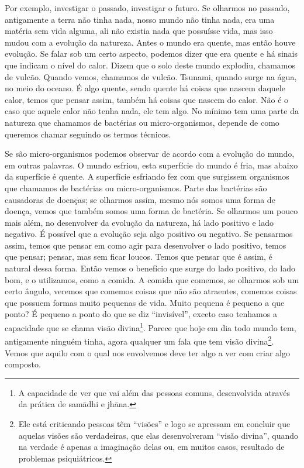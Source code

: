 Por exemplo, investigar o passado, investigar o futuro. Se olharmos
no passado, antigamente a terra não tinha nada, nosso mundo não tinha
nada, era uma matéria sem vida alguma, ali não existia nada que
possuísse vida, mas isso mudou com a evolução da natureza. Antes o
mundo era quente, mas então houve evolução. Se falar sob um certo
aspecto, podemos dizer que era quente e há sinais que indicam o nível
do calor. Dizem que o solo deste mundo explodiu, chamamos de vulcão.
Quando vemos, chamamos de vulcão. Tsunami, quando surge na água, no
meio do oceano. É algo quente, sendo quente há coisas que nascem
daquele calor, temos que pensar assim, também há coisas que nascem do
calor. Não é o caso que aquele calor não tenha nada, ele tem algo. No
mínimo tem uma parte da natureza que chamamos de bactérias ou
micro-organismos, depende de como queremos chamar
seguindo os termos técnicos. 

Se são micro-organismos podemos observar de acordo com a evolução do
mundo, em outras palavras. O mundo esfriou, esta superfície do mundo é
fria, mas abaixo da superfície é quente. A superfície esfriando fez com
que surgissem organismos que chamamos de bactérias ou micro-organismos.
Parte das bactérias são causadoras de doenças; se olharmos assim, mesmo
nós somos uma forma de doença, vemos que também somos uma forma de
bactéria. Se olharmos um pouco mais além, no desenvolver da evolução da
natureza, há lado positivo e lado negativo. É possível que a evolução
seja algo positivo ou negativo. Se pensarmos
assim, temos que pensar em como agir para desenvolver o lado positivo,
temos que pensar; pensar, mas sem ficar loucos. Temos que pensar que é
assim, é natural dessa forma. Então vemos o benefício que surge do lado
positivo, do lado bom, e o utilizamos, como a comida. A comida que
comemos, se olharmos sob um certo ângulo, veremos que comemos coisas
que não são atraentes, comemos coisas que possuem formas muito pequenas
de vida. Muito pequena é pequeno a que ponto? É pequeno a ponto do que
se diz “invisível”, exceto caso tenhamos a capacidade que se chama
visão divina\footnote{A capacidade de ver que vai além das pessoas
comuns, desenvolvida através da prática de sam\=adhi e jh\=ana.}.
Parece que hoje em dia todo mundo tem, antigamente ninguém tinha, agora
qualquer um fala que tem visão divina\footnote{Ele está criticando
pessoas têm “visões” e logo se apressam em concluir que aquelas visões
são verdadeiras, que elas desenvolveram “visão divina”, quando na
verdade é apenas a imaginação delas ou, em muitos casos, resultado de
problemas psiquiátricos. }. Vemos que aquilo com o qual nos envolvemos
deve ter algo a ver com criar algo composto.


